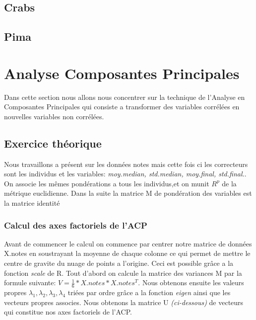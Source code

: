 \documentclass[10pt]{article}
\begin{document}
	\subsection{Crabs}
	
	\subsection{Pima}
	\pagebreak
	
	\section{Analyse Composantes Principales}
	Dans cette section nous allons nous concentrer sur la technique de l’Analyse en Composantes Principales qui consiste a transformer des variables corrélées en nouvelles variables non corrélées.
	\subsection{Exercice théorique}
	Nous travaillons a présent sur les données notes mais cette fois ci les correcteurs sont les individus et les variables: \textit{moy.median, std.median, moy.final, std.final.}. On associe les mêmes pondérations a tous les individus,et on munit $R^{p}$ de la métrique euclidienne. Dans la suite la matrice M de pondération des variables est la matrice identité
	\subsubsection{Calcul des axes factoriels de l'ACP}
	Avant de commencer le calcul on commence par centrer notre matrice de données X.notes en soustrayant la moyenne de chaque colonne ce qui permet de mettre le centre de gravite du nuage de points a l'origine. Ceci est possible grâce a la fonction \textit{scale} de R. Tout d'abord on calcule la matrice des variances M par la formule suivante: $V = \frac{1}{6}* X.notes* X.notes^{T}$. Nous obtenons ensuite les valeurs propres $\lambda_{1}, \lambda_{2}, \lambda_{3}, \lambda_{4}$ triées par ordre grâce a la fonction \textit{eigen} ainsi que les vecteurs propres associes. Nous obtenons la matrice U \textit{(ci-dessous)} de vecteurs qui constitue nos axes factoriels de l'ACP.
	
\end{document}
